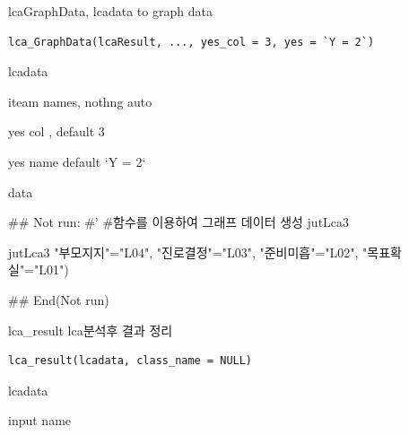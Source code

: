 \documentclass[a4paper]{book}
\begin{document}
%
\begin{Description}
lcaGraphData, lcadata to graph data
\end{Description}
%
\begin{Usage}
\begin{verbatim}
lca_GraphData(lcaResult, ..., yes_col = 3, yes = `Y = 2`)
\end{verbatim}
\end{Usage}
%
\begin{Arguments}
\begin{ldescription}
\item[\code{lcaResult}] lcadata

\item[\code{...}] iteam names, nothng auto

\item[\code{yes\_col}] yes col , default 3

\item[\code{yes}] yes name default `Y = 2`
\end{ldescription}
\end{Arguments}
%
\begin{Value}
data
\end{Value}
%
\begin{Examples}
\begin{ExampleCode}
\#\# Not run: 
#'
#함수를 이용하여 그래프 데이터 생성
jutLca3 %

jutLca3 %
                         "부모지지"="L04",
                         "진로결정"="L03",
                         "준비미흡"="L02",
                         "목표확실"="L01")


## End(Not run)

\end{ExampleCode}
\end{Examples}
%
\begin{Description}
lca\_result lca분석후 결과 정리
\end{Description}
%
\begin{Usage}
\begin{verbatim}
lca_result(lcadata, class_name = NULL)
\end{verbatim}
\end{Usage}
%
\begin{Arguments}
\begin{ldescription}
\item[\code{lcadata}] lcadata

\item[\code{class\_name}] input name
\end{ldescription}
\end{Arguments}
\end{document}
